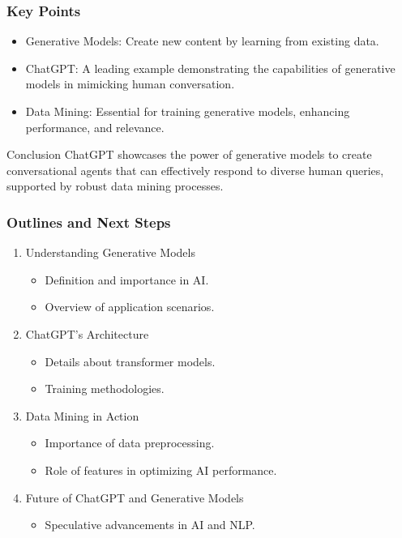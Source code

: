 \documentclass[aspectratio=169]{beamer}
\begin{document}
\begin{frame}[fragile]
    \frametitle{Key Points}
    \begin{itemize}
        \item Generative Models: Create new content by learning from existing data.
        \item ChatGPT: A leading example demonstrating the capabilities of generative models in mimicking human conversation.
        \item Data Mining: Essential for training generative models, enhancing performance, and relevance.
    \end{itemize}

    \begin{block}{Conclusion}
        ChatGPT showcases the power of generative models to create conversational agents that can effectively respond to diverse human queries, supported by robust data mining processes.
    \end{block}
\end{frame}

\begin{frame}[fragile]
    \frametitle{Outlines and Next Steps}
    \begin{enumerate}
        \item Understanding Generative Models
            \begin{itemize}
                \item Definition and importance in AI.
                \item Overview of application scenarios.
            \end{itemize}
        \item ChatGPT's Architecture
            \begin{itemize}
                \item Details about transformer models.
                \item Training methodologies.
            \end{itemize}
        \item Data Mining in Action
            \begin{itemize}
                \item Importance of data preprocessing.
                \item Role of features in optimizing AI performance.
            \end{itemize}
        \item Future of ChatGPT and Generative Models
            \begin{itemize}
                \item Speculative advancements in AI and NLP.
            \end{itemize}
    \end{enumerate}
\end{frame}
\end{document}

